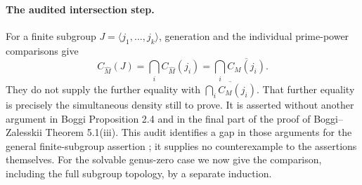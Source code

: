 \paragraph{The audited intersection step.}
For a finite subgroup $J=\langle j_1,\ldots,j_k\rangle$,
generation and the individual prime-power comparisons give
\[
 C_{\widehat M}(J)
   =\bigcap_i C_{\widehat M}(j_i)
   =\bigcap_i\overline{C_M(j_i)}.
                                                               \tag{A.C2}
\]
They do not supply the further equality with
$\overline{\bigcap_i C_M(j_i)}$.  That further equality is precisely
the simultaneous density still to prove.  It is asserted without
another argument in Boggi Proposition 2.4 and in the final part of
the proof of Boggi--Zalesskii Theorem 5.1(iii).  This audit identifies
a gap in those arguments for the general finite-subgroup assertion
\cite[Proposition 2.4]{CA_Boggi2026};
it supplies no counterexample to the assertions themselves.  For
the solvable genus-zero case we now give the comparison, including
the full subgroup topology, by a separate induction.

